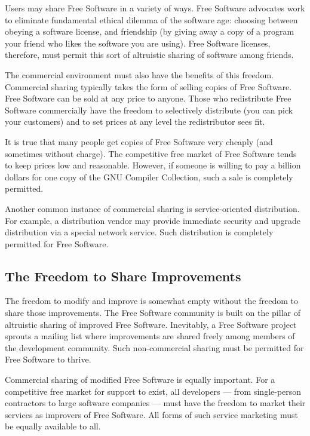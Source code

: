 \documentclass[12pt]{report}
\begin{document}
Users may share Free Software in a variety of ways.  Free Software
advocates work to eliminate fundamental ethical dilemma of the software
age: choosing between obeying a software license, and friendship (by
giving away a copy of a program your friend who likes the software you are
using).  Free Software licenses, therefore, must permit this sort of
altruistic sharing of software among friends.

The commercial environment must also have the benefits of this freedom.
Commercial sharing typically takes the form of selling copies of Free
Software.  Free Software can be sold at any price to anyone.  Those who
redistribute Free Software commercially have the freedom to selectively
distribute (you can pick your customers) and to set prices at any level
the redistributor sees fit.

It is true that many people get copies of Free Software very cheaply (and
sometimes without charge). The competitive free market of Free Software
tends to keep prices low and reasonable.  However, if someone is willing
to pay a billion dollars for one copy of the GNU Compiler Collection, such
a sale is completely permitted.

Another common instance of commercial sharing is service-oriented
distribution.  For example, a distribution vendor may provide immediate
security and upgrade distribution via a special network service.  Such
distribution is completely permitted for Free Software.

\subsection{The Freedom to Share Improvements}

The freedom to modify and improve is somewhat empty without the freedom to
share those improvements.  The Free Software community is built on the
pillar of altruistic sharing of improved Free Software.  Inevitably, a
Free Software project sprouts a mailing list where improvements are shared
freely among members of the development community.  Such non-commercial
sharing must be permitted for Free Software to thrive.

Commercial sharing of modified Free Software is equally important.  For a
competitive free market for support to exist, all developers --- from
single-person contractors to large software companies --- must have the
freedom to market their services as improvers of Free Software.  All forms
of such service marketing must be equally available to all.
\end{document}
